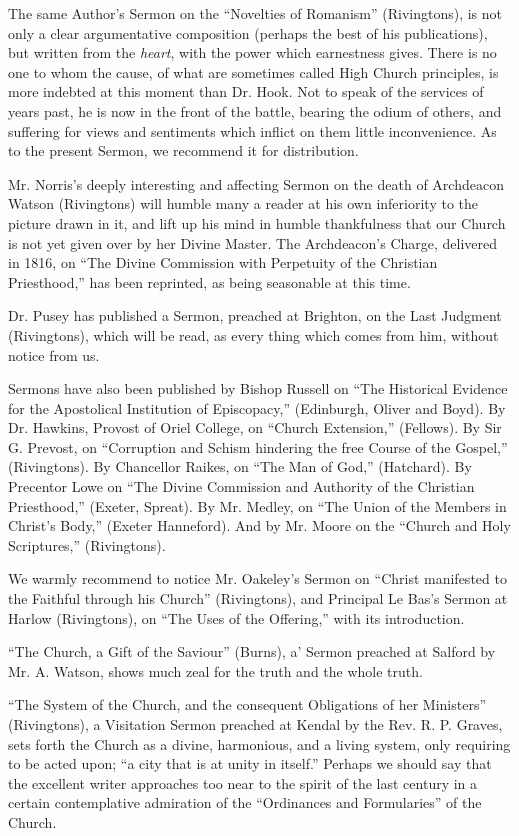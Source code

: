 The same Author's Sermon on the ``Novelties of
Romanism'' (Rivingtons), is not only a clear argumentative composition
(perhaps the best of his publications), but written from the \emph{heart},
with the power which earnestness gives. There is no one to whom the
cause, of what are sometimes called High Church principles, is more
indebted at this moment than Dr. Hook. Not to speak of the services of
years past, he is now in the front of the battle, bearing the odium of
others, and suffering for views and sentiments which inflict on them
little inconvenience. As to the present Sermon, we recommend it for
distribution.

Mr. Norris's deeply interesting and affecting
Sermon on the death of Archdeacon Watson (Rivingtons) will humble many a
reader at his own inferiority to the picture drawn in it, and lift up
his mind in humble thankfulness that our Church is not yet given over by
her Divine Master. The Archdeacon's Charge, delivered in 1816, on ``The
Divine Commission with Perpetuity of the Christian Priesthood,'' has been
reprinted, as being seasonable at this time.

Dr. Pusey has published a Sermon, preached at
Brighton, on the Last Judgment (Rivingtons), which will be read, as
every thing which comes from him, without notice from us.

Sermons have also been published by Bishop Russell
on ``The Historical Evidence for the Apostolical Institution of
Episcopacy,'' (Edinburgh, Oliver and Boyd). By Dr. Hawkins, Provost of
Oriel College, on ``Church Extension,'' (Fellows). By Sir G. Prevost, on ``Corruption
and Schism hindering the free Course of the Gospel,'' (Rivingtons). By
Chancellor Raikes, on ``The Man of God,'' (Hatchard). By Precentor Lowe on
``The Divine Commission and Authority of the Christian Priesthood,''
(Exeter, Spreat). By Mr. Medley, on ``The Union of the Members in Christ's
Body,'' (Exeter Hanneford). And by Mr. Moore on the ``Church and Holy
Scriptures,'' (Rivingtons).

We warmly recommend to notice Mr. Oakeley's Sermon
on ``Christ manifested to the Faithful through his Church'' (Rivingtons),
and Principal Le Bas's Sermon at Harlow (Rivingtons), on ``The Uses of
the Offering,'' with its introduction.

``The Church, a Gift of the Saviour'' (Burns), a'
Sermon preached at Salford by Mr. A. Watson, shows much zeal for the
truth and the whole truth.

``The System of the Church, and the consequent
Obligations of her Ministers'' (Rivingtons), a Visitation Sermon preached
at Kendal by the Rev. R. P. Graves, sets forth the Church as a divine,
harmonious, and a living system, only requiring to be acted upon; ``a
city that is at unity in itself.'' Perhaps we should say that the
excellent writer approaches too near to the spirit of the last century
in a certain contemplative admiration of the ``Ordinances and Formularies''
of the Church.

